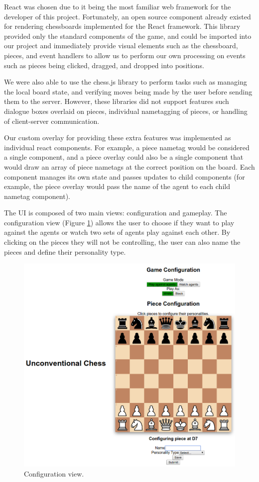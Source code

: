 \documentclass{article}
\begin{document}
React \cite{reactjs} was chosen due to it being the most familiar web framework for the developer of this project. Fortunately, an open source component already existed for rendering chessboards \cite{chessboardjsx} implemented for the React framework. This library provided only the standard components of the game, and could be imported into our project and immediately provide visual elements such as the chessboard, pieces, and event handlers to allow us to perform our own processing on events such as pieces being clicked, dragged, and dropped into positions. 

We were also able to use the chess.js \cite{chessjs} library to perform tasks such as managing the local board state, and verifying moves being made by the user before sending them to the server. However, these libraries did not support features such dialogue boxes overlaid on pieces, individual nametagging of pieces, or handling of client-server communication. 

Our custom overlay for providing these extra features was implemented as individual react components. For example, a piece nametag would be considered a single component, and a piece overlay could also be a single component that would draw an array of piece nametags at the correct position on the board. Each component manages its own state and passes updates to child components (for example, the piece overlay would pass the name of the agent to each child nametag component).

The UI is composed of two main views: configuration and gameplay. 
The configuration view (Figure \ref{fig:configview}) allows the user to choose if they want to play against the agents or watch two sets of agents play against each other. By clicking on the pieces they will not be controlling, the user can also name the pieces and define their personality type. 

\begin{figure}[!h]
	\centering
	\includegraphics[width=0.9\linewidth]{images/configview}
	\caption{Configuration view.}
	\label{fig:configview}
\end{figure}
\end{document}
